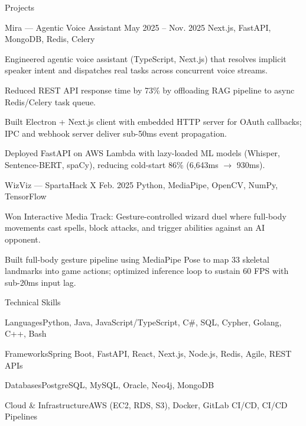 \documentclass[
	11pt
]{../../../resume}
\begin{document}
	\begin{rSection}{P}{rojects}
		\begin{rSectionEntry}
			{Mira --- Agentic Voice Assistant}
			{May 2025 -- Nov. 2025}
			{}
			{Next.js, FastAPI, MongoDB, Redis, Celery}
			{}

			\item Engineered agentic voice assistant (TypeScript, Next.js) that resolves implicit speaker intent and dispatches real tasks across concurrent voice streams.
			\item Reduced REST API response time by 73\% by offloading RAG pipeline to async Redis/Celery task queue.
			\item Built Electron + Next.js client with embedded HTTP server for OAuth callbacks; IPC and webhook server deliver sub-50ms event propagation.
			\item Deployed FastAPI on AWS Lambda with lazy-loaded ML models (Whisper, Sentence-BERT, spaCy), reducing cold-start 86\% (6{,}643ms $\rightarrow$ 930ms).
		\end{rSectionEntry}

		\begin{rSectionEntry}
			{WizViz --- SpartaHack X}
			{Feb. 2025}
			{}
			{Python, MediaPipe, OpenCV, NumPy, TensorFlow}
			{}

			\item Won Interactive Media Track: Gesture-controlled wizard duel where full-body movements cast spells, block attacks, and trigger abilities against an AI opponent.
			\item Built full-body gesture pipeline using MediaPipe Pose to map 33 skeletal landmarks into game actions; optimized inference loop to sustain 60 FPS with sub-20ms input lag.
		\end{rSectionEntry}
	\end{rSection}

	\begin{rSection}{T}{echnical Skills}
		\begin{rSet}{Languages}{Python, Java, JavaScript/TypeScript, C\#, SQL, Cypher, Golang, C++, Bash}
		\end{rSet}
		\begin{rSet}{Frameworks}{Spring Boot, FastAPI, React, Next.js, Node.js, Redis, Agile, REST APIs}
		\end{rSet}
		\begin{rSet}{Databases}{PostgreSQL, MySQL, Oracle, Neo4j, MongoDB}
		\end{rSet}
		\begin{rSet}{Cloud \& Infrastructure}{AWS (EC2, RDS, S3), Docker, GitLab CI/CD, CI/CD Pipelines}
		\end{rSet}
	\end{rSection}
\end{document}
